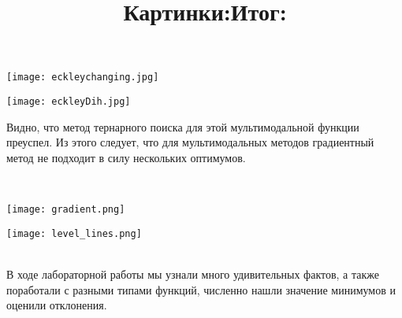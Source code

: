 \documentclass[12pt]{article}
\begin{document}
\begin{center}

\centering

\texttt{[image: eckleychanging.jpg]}



\label{fig:mpr}

\end{center}


\begin{center}

\centering

\texttt{[image: eckleyDih.jpg]}



\label{fig:mpr}

\end{center}
Видно, что метод тернарного поиска для этой мультимодальной функции преуспел. Из этого следует, что для мультимодальных методов градиентный метод не подходит в силу нескольких оптимумов.\\

\title{\textbf{Картинки:}} \\
\begin{center}

\centering

\texttt{[image: gradient.png]}



\label{fig:mpr}

\end{center}

\begin{center}

\centering

\texttt{[image: level\_lines.png]}



\label{fig:mpr}

\end{center}

\title{\textbf{Итог:}} \\
В ходе лабораторной работы мы узнали много удивительных фактов, а также поработали с разными типами функций, численно нашли значение минимумов и оценили отклонения.
\end{document}
